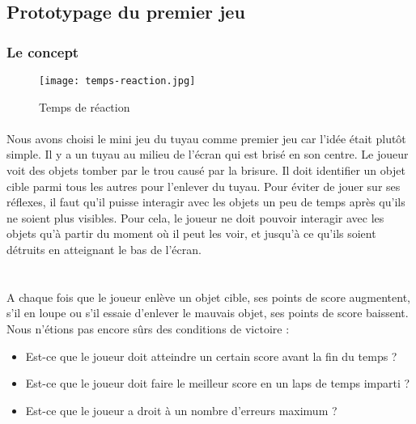 \subsection{Prototypage du premier jeu}


\subsubsection{Le concept}


\begin{wrapfigure}[15]{l}{5cm}
    \vspace{-15pt}
    \texttt{[image: temps-reaction.jpg]}
    \captionsetup{labelformat=simpleNumber}
    \caption{Temps de réaction}
\end{wrapfigure}

\paragraph{}Nous avons choisi le mini jeu du tuyau comme premier jeu car l'idée était plutôt simple. Il y a un tuyau au milieu de l'écran qui est brisé en son centre. Le
joueur voit des objets tomber par le trou causé par la brisure. Il doit identifier un objet cible parmi tous les autres pour l'enlever du tuyau. Pour éviter de jouer sur ses réflexes,
il faut qu'il puisse interagir avec les objets un peu de temps après qu'ils ne soient plus visibles. Pour cela, le joueur ne doit pouvoir interagir avec les objets qu'à partir du
moment où il peut les voir, et jusqu'à ce qu'ils soient détruits en atteignant le bas de l'écran.\\ \\

\paragraph{}A chaque fois que le joueur enlève un objet cible, ses points de score augmentent, s'il en loupe ou s'il essaie d'enlever le mauvais objet, ses points de score baissent.
Nous n'étions pas encore sûrs des conditions de victoire :
\begin{itemize}
\item Est-ce que le joueur doit atteindre un certain score avant la fin du temps ?
\item Est-ce que le joueur doit faire le meilleur score en un laps de temps imparti ?
\item Est-ce que le joueur a droit à un nombre d'erreurs maximum ?
\end{itemize}


